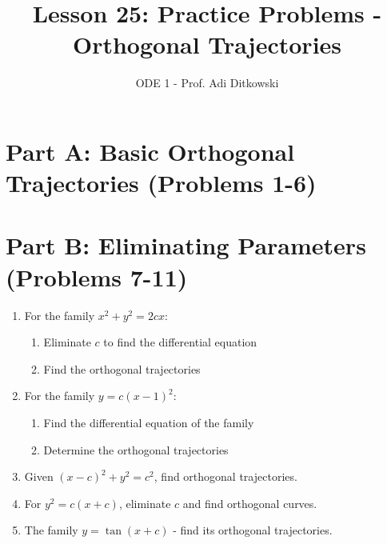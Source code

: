 \documentclass[12pt]{article}
\title{Lesson 25: Practice Problems - Orthogonal Trajectories}
\author{ODE 1 - Prof. Adi Ditkowski}
\date{}
\begin{document}
\maketitle

\section*{Part A: Basic Orthogonal Trajectories (Problems 1-6)}


\section*{Part B: Eliminating Parameters (Problems 7-11)}

\begin{enumerate}[start=7]
\item For the family $x^{2} + y^{2} = 2cx$:
\begin{enumerate}[label=(\alph*)]
    \item Eliminate $c$ to find the differential equation
    \item Find the orthogonal trajectories
\end{enumerate}

\item For the family $y = c(x-1)^{2}$:
\begin{enumerate}[label=(\alph*)]
    \item Find the differential equation of the family
    \item Determine the orthogonal trajectories
\end{enumerate}

\item Given $(x-c)^{2} + y^{2} = c^{2}$, find orthogonal trajectories.

\item For $y^{2} = c(x+c)$, eliminate $c$ and find orthogonal curves.

\item The family $y = \tan(x + c)$ - find its orthogonal trajectories.
\end{enumerate}
\end{document}
